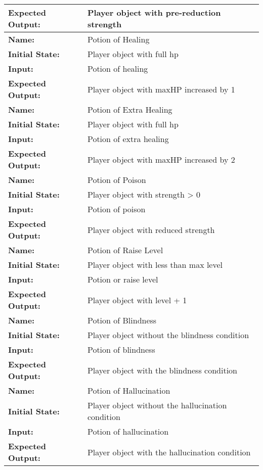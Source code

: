 \documentclass[12pt, titlepage]{article}
\begin{document}
\begin{center}
\begin{longtable}{ l | p{10cm} }
				\textbf{Expected Output:} & Player object with pre-reduction strength\\[1em]
				\hline
				\rule{0pt}{2em}\textbf{Name:} & Potion of Healing\\
				\textbf{Initial State:} & Player object with full hp\\
				\textbf{Input:} & Potion of healing\\
				\textbf{Expected Output:} & Player object with maxHP increased by 1\\[1em]
				\hline
				\rule{0pt}{2em}\textbf{Name:} & Potion of Extra Healing\\
				\textbf{Initial State:} & Player object with full hp\\
				\textbf{Input:} & Potion of extra healing\\
				\textbf{Expected Output:} & Player object with maxHP increased by 2\\[1em]
				\hline
				\rule{0pt}{2em}\textbf{Name:} & Potion of Poison\\
				\textbf{Initial State:} & Player object with strength > 0\\
				\textbf{Input:} & Potion of poison\\
				\textbf{Expected Output:} & Player object with reduced strength\\[1em]
				\hline
				\rule{0pt}{2em}\textbf{Name:} & Potion of Raise Level\\
				\textbf{Initial State:} & Player object with less than max level\\
				\textbf{Input:} & Potion or raise level\\
				\textbf{Expected Output:} & Player object with level + 1\\[1em]
				\hline
				\rule{0pt}{2em}\textbf{Name:} & Potion of Blindness\\
				\textbf{Initial State:} & Player object without the blindness condition\\
				\textbf{Input:} & Potion of blindness\\
				\textbf{Expected Output:} & Player object with the blindness condition\\[1em]
				\hline
				\rule{0pt}{2em}\textbf{Name:} & Potion of Hallucination\\
				\textbf{Initial State:} & Player object without the hallucination condition\\
				\textbf{Input:} & Potion of hallucination\\
				\textbf{Expected Output:} & Player object with the hallucination condition\\[1em]

\end{longtable}
\end{center}
\end{document}
